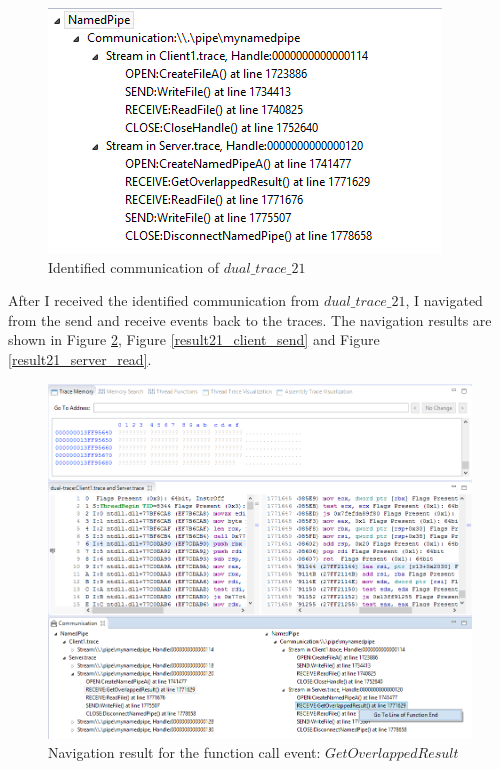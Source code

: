 \begin{figure}[H]
\centerline{\includegraphics{Figures/result21_communications}}
 \caption{Identified communication of $dual\_trace\_21$}
\label{result21_communications}
\end{figure}

After I received the identified communication from $dual\_trace\_21$, I navigated from the send and receive events back to the traces. The navigation results are shown in Figure \ref{result21_server_readnull},  Figure \ref{result21_client_send} and Figure \ref{result21_server_read}.

\begin{figure}[H]
\centerline{\includegraphics[width=\textwidth]{Figures/result21_server_readnull}}
 \caption{Navigation result for the function call event: $GetOverlappedResult$}
\label{result21_server_readnull}
\end{figure}


